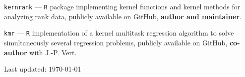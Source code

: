 \documentclass[10pt,a4paper]{article}
\renewenvironment{itemize}{
  \begin{list}{}{
    \setlength{\leftmargin}{1.2em}
  }
}{
  \end{list}
}
\begin{document}
\begin{itemize}
\item \texttt{kernrank} --- \texttt{R} package implementing kernel functions and kernel methods for analyzing rank data, publicly available on GitHub, \textbf{author and maintainer}.
\item \texttt{kmr} --- \texttt{R} implementation of a kernel multitask regression algorithm to solve simultaneously several regression problems, publicly available on GitHub, \textbf{co-author} with J.-P. Vert.
\end{itemize}

\bigskip

\begin{center}
  \begin{footnotesize}
    Last updated: \today
  \end{footnotesize}
\end{center}



\end{document}
